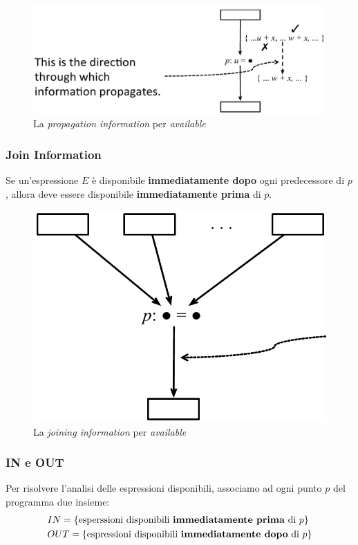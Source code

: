 \begin{figure}[H]
  \centering
  \includegraphics[scale=0.4]{res/image/propagation_available}
  \caption{La \textit{propagation information} per \textit{available}}
  \label{img:propagation_available}
\end{figure}

\subsubsection{Join Information}
Se un'espressione $E$ \`e disponibile \textbf{immediatamente dopo} ogni
predecessore di $p$, allora deve essere disponibile
\textbf{immediatamente prima} di $p$.

\begin{figure}[H]
  \centering
  \includegraphics[scale=0.4]{res/image/joining_available}
  \caption{La \textit{joining information} per \textit{available}}
  \label{img:joining_available}
\end{figure}

\subsubsection{IN e OUT}
Per risolvere l'analisi delle espressioni disponibili, associamo ad ogni
punto $p$ del programma due insieme:
\begin{align*}
& IN =
\{\text{esperssioni disponibili \textbf{immediatamente prima} di $p$}
\} \\
& OUT =
\{\text{espressioni disponibili \textbf{immediatamente dopo} di $p$}
\}
\end{align*}

